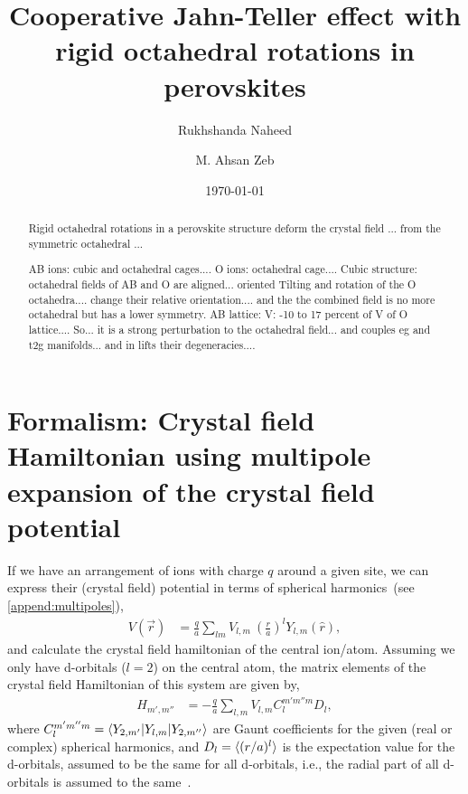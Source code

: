 \documentclass[a4paper,prb]{revtex4-1}  %
\newcommand{\ylm}[1]{Y_{#1}(\hat r)}
\begin{document}
\title{Cooperative Jahn-Teller effect with rigid octahedral rotations in perovskites}


\author{Rukhshanda Naheed}

\author{M. Ahsan Zeb}

\date{\today}
\begin{abstract}

Rigid octahedral rotations in a perovskite structure 
deform the crystal field ... from the symmetric octahedral ...


AB ions: cubic and octahedral cages....
O ions: octahedral cage....
Cubic structure: octahedral fields of AB and O are aligned... oriented 
Tilting and rotation of the O octahedra.... change their relative orientation....
and the the combined field is no more octahedral but has a lower symmetry. 
AB lattice: V: -10 to 17 percent of V of O lattice....
So... it is a strong perturbation to the octahedral field... and couples eg and t2g manifolds... and in lifts their degeneracies.... 




\end{abstract}




 
\section{Formalism: Crystal field Hamiltonian using multipole expansion of the crystal field potential}

If we have an arrangement of ions with charge $q$ around a given site,
we can express their (crystal field) potential in terms of spherical harmonics~(see \ref{append:multipoles}), 
\begin{align}
V(\vec r) &= \frac{q}{a}\sum_{lm}V_{l,m}~\left(\frac{r}{a}\right)^l \ylm{l,m},
\end{align}
and calculate the crystal field hamiltonian of the central ion/atom.
Assuming we only have d-orbitals ($l=2$) on the central atom,
the matrix elements of the crystal field Hamiltonian of this system 
are given by,
\begin{align}
H_{m',m''} &= -\frac{q}{a}\sum_{l,m} V_{l,m} C_{l}^{m'm''m} D_{l} ,
\end{align}
where 
$C_{l}^{m'm''m}=\braket{Y_{2,m'}| Y_{l,m}| Y_{2,m''}}$ are Gaunt coefficients for the given (real or complex) spherical harmonics,
and $D_{l}=\braket{(r/a)^l}$ is the expectation value for the d-orbitals, assumed to be the same for all d-orbitals, i.e., the radial part of all d-orbitals is assumed to the same~\cite{paxton-notes}.
\end{document}
